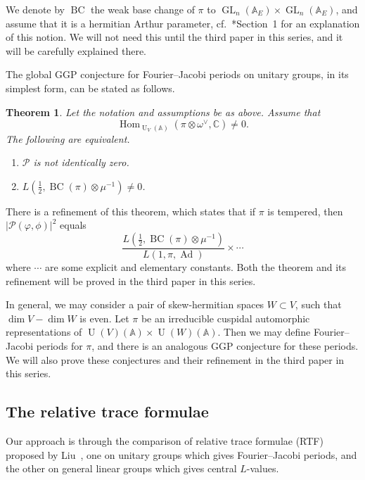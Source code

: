 \documentclass[letterpaper,11pt]{amsart}
\newcommand{\bA}{\mathbb{A}}
\newcommand{\C}{\mathbb{C}}
\newcommand{\cP}{\mathcal{P}}
\newcommand{\<}{\negthickspace}
\providecommand{\abs}[1]{\lvert#1\rvert}
\DeclareMathOperator{\GL}{GL}
\DeclareMathOperator{\U}{U}
\DeclareMathOperator{\Hom}{Hom}
\DeclareMathOperator{\BC}{BC}
\DeclareMathOperator{\Ad}{Ad}
\theoremstyle{definition}
\theoremstyle{plain}
\newtheorem{theorem}[definition]{Theorem}
\theoremstyle{remark}
\numberwithin{equation}{section}
\begin{document}
We denote by $\BC$ the weak base change of $\pi$ to $\GL_n(\bA_E) \times \GL_n(\bA_E)$, and assume that it is a hermitian Arthur parameter, cf.~\cite{BPCZ}*{Section~1} for an explanation of this notion. We will not need this until the third paper in this series, and it will be carefully explained there.

The global GGP conjecture for Fourier--Jacobi periods on unitary groups, in its simplest form, can be stated as follows.


\begin{theorem}\label{thm:GGP_intro}
Let the notation and assumptions be as above. Assume that
    \[
    \Hom_{\U_V(\bA)}(\pi \otimes \omega^\vee, \C)
    \not=0.
    \]
The following are equivalent.
\begin{enumerate}
\item $\cP$ is not identically zero.

\item $L(\frac{1}{2}, \BC(\pi) \otimes \mu^{-1})
    \not=0$.
\end{enumerate} 
\end{theorem}

There is a refinement of this theorem, which states that if $\pi$ is tempered, then $\abs{\cP(\varphi,\phi)}^2$ equals
    \[
    \frac{L(\frac{1}{2}, \BC(\pi) \otimes \mu^{-1})}{L(1, \pi, \Ad)} \times \cdots
    \]
where $\cdots$ are some explicit and elementary constants.  Both the theorem and its refinement will be proved in the third paper in this series.

In general, we may consider a pair of skew-hermitian spaces $W \subset V$, such that $\dim V - \dim W$ is even. Let $\pi$ be an irreducible cuspidal automorphic representations of $\U(V)(\bA) \times \U(W)(\bA)$. Then we may define Fourier--Jacobi periods for $\pi$, and there is an analogous GGP conjecture for these periods. We will also prove these conjectures and their refinement in the third paper in this series.




\subsection{The relative trace formulae}
Our approach is through the comparison of relative trace formulae (RTF) proposed by Liu~\cite{Liu}, one on unitary groups which gives Fourier--Jacobi periods, and the other on general linear groups which gives central $L$-values.
\end{document}
